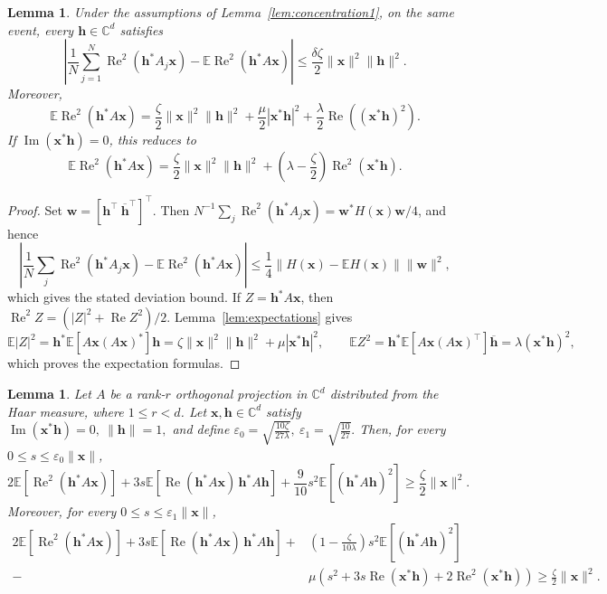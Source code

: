 \documentclass{article}
\newcommand{\C}{{\mathbb C}}
\newcommand{\E}{{\mathbb E}}
\newcommand{\vx}{{\mathbf x}}
\newcommand{\vh}{{\mathbf h}}
\newcommand{\0}{{\mathbf 0}}
\newtheorem{lemma}[theorem]{Lemma}
\numberwithin{equation}{section}
\begin{document}
	\begin{lemma}\label{lem:concentration1-1}
		Under the assumptions of Lemma~\ref{lem:concentration1}, on the same event, every $\vh\in\C^d$ satisfies
		\[
		\left|\frac1N\sum_{j=1}^N\operatorname{Re}^2(\vh^*A_j\vx)-\E\operatorname{Re}^2(\vh^*A\vx)\right|\le\frac{\delta\zeta}{2}\|\vx\|^2\|\vh\|^2.
		\]
		Moreover,
		\[
		\E\operatorname{Re}^2(\vh^*A\vx)=\frac\zeta2\|\vx\|^2\|\vh\|^2+\frac\mu2|\vx^*\vh|^2+\frac\lambda2\operatorname{Re}((\vx^*\vh)^2).
		\]
		If $\operatorname{Im}(\vx^*\vh)=0$, this reduces to
		\[
		\E\operatorname{Re}^2(\vh^*A\vx)=\frac\zeta2\|\vx\|^2\|\vh\|^2+\left(\lambda-\frac\zeta2\right)\operatorname{Re}^2(\vx^*\vh).
		\]
	\end{lemma}
	\begin{proof}
		Set $\mathbf w=[\vh^\top\ \overline\vh^\top]^\top$. Then $N^{-1}\sum_j\operatorname{Re}^2(\vh^*A_j\vx)=\mathbf w^*H(\vx)\mathbf w/4$, and hence
		\[
		\left|\frac1N\sum_j\operatorname{Re}^2(\vh^*A_j\vx)-\E\operatorname{Re}^2(\vh^*A\vx)\right|\le\frac14\|H(\vx)-\E H(\vx)\|\|\mathbf w\|^2,
		\]
		which gives the stated deviation bound. If $Z=\vh^*A\vx$, then $\operatorname{Re}^2Z=(|Z|^2+\operatorname{Re}Z^2)/2$. Lemma~\ref{lem:expectations} gives
		\[
		\E|Z|^2=\vh^*\E[A\vx(A\vx)^*]\vh=\zeta\|\vx\|^2\|\vh\|^2+\mu|\vx^*\vh|^2,\qquad \E Z^2=\vh^*\E[A\vx(A\vx)^\top]\overline{\vh}=\lambda(\vx^*\vh)^2,
		\]
		which proves the expectation formulas.
	\end{proof}
	\begin{lemma}\label{lem:initial_bound}
		Let $A$ be a rank-$r$ orthogonal projection in $\C^d$ distributed from the Haar measure, where $1\le r<d$. Let $\vx,\vh\in\C^d$ satisfy $
		\operatorname{Im}(\vx^*\vh)=0,\ \|\vh\|=1,
		$
		and define
		$
		\varepsilon_0=\sqrt{\frac{10\zeta}{27\lambda}},\ 
		\varepsilon_1=\sqrt{\frac{10}{27}}.
		$
		Then, for every $0\le s\le\varepsilon_0\|\vx\|$,
		\[
		2\E\!\left[\operatorname{Re}^2(\vh^*A\vx)\right]
		+3s\E\!\left[\operatorname{Re}(\vh^*A\vx)\,\vh^*A\vh\right]
		+\frac{9}{10}s^2\E\!\left[(\vh^*A\vh)^2\right]
		\ge\frac{\zeta}{2}\|\vx\|^2.
		\]
		Moreover, for every $0\le s\le\varepsilon_1\|\vx\|$,
		\begin{align*}
			2\E\!\left[\operatorname{Re}^2(\vh^*A\vx)\right]
			+3s\E\!\left[\operatorname{Re}(\vh^*A\vx)\,\vh^*A\vh\right]
			+&\left(1-\frac{\zeta}{10\lambda}\right)s^2\E\!\left[(\vh^*A\vh)^2\right]\\
            -&\mu\left(s^2+3s\operatorname{Re}(\vx^*\vh)
			+2\operatorname{Re}^2(\vx^*\vh)\right)
			\ge\frac{\zeta}{2}\|\vx\|^2.
		\end{align*}
	\end{lemma}
	
\end{document}
